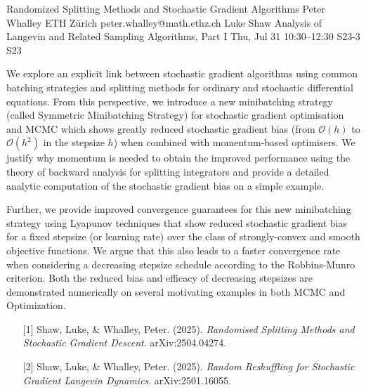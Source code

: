 \begin{talk}
  {Randomized Splitting Methods and Stochastic Gradient Algorithms}%
  {Peter Whalley}%
  {ETH Z\"{u}rich}%
  {peter.whalley@math.ethz.ch}%
  {Luke Shaw}%
  {Analysis of Langevin and Related Sampling Algorithms, Part I}%
  {Thu, Jul 31 10:30–12:30}%
  {S23-3}%
  {S23}%
				
			
We explore an explicit link between stochastic gradient algorithms using common batching strategies and splitting methods for ordinary and stochastic differential equations. From this perspective, we introduce a new minibatching strategy (called Symmetric Minibatching Strategy) for stochastic gradient optimisation and MCMC which shows greatly reduced stochastic gradient bias (from $\mathcal{O}(h)$ to $\mathcal{O}(h^{2})$ in the stepsize $h$) when combined with momentum-based optimisers. We justify why momentum is needed to obtain the improved performance using the theory of backward analysis for splitting integrators and provide a detailed analytic computation of the stochastic gradient bias on a simple example.

 

Further, we provide improved convergence guarantees for this new minibatching strategy using Lyapunov techniques that show reduced stochastic gradient bias for a fixed stepsize (or learning rate) over the class of strongly-convex and smooth objective functions. We argue that this also leads to a faster convergence rate when considering a decreasing stepsize schedule according to the Robbins-Munro criterion. Both the reduced bias and efficacy of decreasing stepsizes are demonstrated numerically on several motivating examples in both MCMC and Optimization.

\medskip

\begin{enumerate}
	\item[{[1]}] Shaw, Luke, \& Whalley, Peter. (2025). {\it Randomised Splitting Methods and Stochastic Gradient Descent}. arXiv:2504.04274.
	\item[{[2]}] Shaw, Luke, \& Whalley, Peter. (2025). {\it Random Reshuffling for Stochastic Gradient Langevin Dynamics}. arXiv:2501.16055.
\end{enumerate}

\end{talk}


